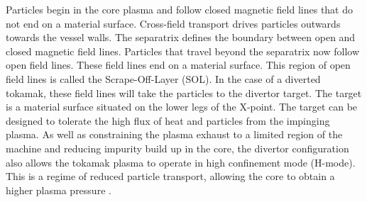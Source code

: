 	Particles begin in the core plasma and follow closed magnetic field lines that do not end on a material surface. Cross-field transport drives particles outwards towards the vessel walls. The separatrix defines the boundary between open and closed magnetic field lines. Particles that travel beyond the separatrix now follow open field lines. These field lines end on a material surface. This region of open field lines is called the Scrape-Off-Layer (SOL).  In the case of a diverted tokamak, these field lines will take the particles to the divertor target. The target is a material surface situated on the lower legs of the X-point. The target can be designed to tolerate the high flux of heat and particles from the impinging plasma. As well as constraining the plasma exhaust to a limited region of the machine and reducing impurity build up in the core, the divertor configuration also allows the tokamak plasma to operate in high confinement mode (H-mode). This is a regime of reduced particle transport, allowing the core to obtain a higher plasma pressure \cite{H-mode}.
	
	
	
	
	
	

